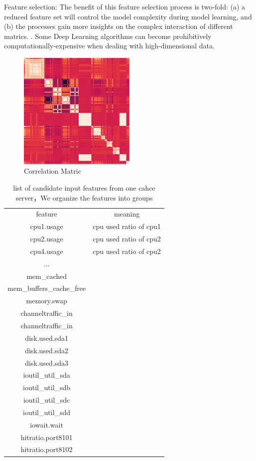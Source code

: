 \documentclass[review]{elsarticle}
\begin{document}
Feature selection: The benefit of this feature selection process is two-fold: (a) a reduced feature set will control the model complexity during model learning, and (b) the processes gain more insights on the complex interaction of different matrics. \cite{Yeom2016Data-DrivenMatrices}. Some Deep Learning algorithms can become prohibitively computationally-expensive when dealing with high-dimensional data. 



\begin{figure}[h]
    \centering
    \includegraphics[width=0.5\textwidth]{Correlation_Matric.png}
    \caption{Correlation Matric}
    \label{fig:Correlation Matric}
\end{figure}

\begin{table}[]
\centering
\begin{tabular}{|c|c|}
\hline  
feature &   meaning\\
cpu1.usage &   cpu used ratio of cpu1\\
cpu2.usage &   cpu used ratio of cpu2\\
cpu4.usage &   cpu used ratio of cpu2\\
... & \\
\hline  
mem\_cached & \\
mem\_buffers\_cache\_free & \\
memory.swap  &\\ 
\hline  
channeltraffic\_in   & \\
channeltraffic\_in   & \\
\hline  
disk.used.sda1 &\\
disk.used.sda2 &\\
disk.used.sda3 &\\
\hline  
ioutil\_util\_sda & \\
ioutil\_util\_sdb & \\
ioutil\_util\_sdc & \\
ioutil\_util\_sdd & \\
iowait.wait & \\
\hline
hitratio.port8101 & \\
hitratio.port8102 & \\
\hline        
\end{tabular}
\caption{list of candidate input features from one cahce server，We organize the features into groups}
\label{my-label}
\end{table}
\end{document}
